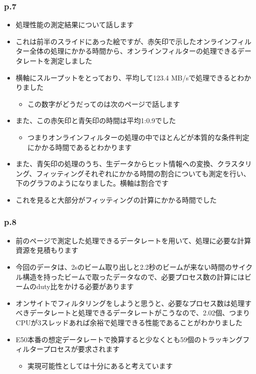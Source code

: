 \documentclass[12pt,a4paper,upLaTeX]{jsarticle}
\begin{document}
\subsubsection*{p.7}
\begin{itemize}
\item 処理性能の測定結果について話します
\item これは前半のスライドにあった絵ですが、赤矢印で示したオンラインフィルター全体の処理にかかる時間から、オンラインフィルターの処理できるデータレートを測定しました
\item 横軸にスループットをとっており、平均して123.4 MB/sで処理できるとわかりました
\begin{itemize}
\item この数字がどうだってのは次のページで話します
\end{itemize}
\item また、この赤矢印と青矢印の時間は平均1:0.9でした
\begin{itemize}
\item つまりオンラインフィルターの処理の中でほとんどが本質的な条件判定にかかる時間であるとわかります
\end{itemize}
\item また、青矢印の処理のうち、生データからヒット情報への変換、クラスタリング、フィッティングそれぞれにかかる時間の割合についても測定を行い、下のグラフのようになりました。横軸は割合です
\item これを見ると大部分がフィッティングの計算にかかる時間でした
\end{itemize}

\subsubsection*{p.8}
\begin{itemize}
\item 前のページで測定した処理できるデータレートを用いて、処理に必要な計算資源を見積もります
\item 今回のデータは、2sのビーム取り出しと2.2秒のビームが来ない時間のサイクル構造を持ったビームで取ったデータなので、必要プロセス数の計算にはビームのduty比をかける必要があります
\item オンサイトでフィルタリングをしようと思うと、必要なプロセス数は処理すべきデータレートと処理できるデータレートがこうなので、2.02個、つまりCPUが3スレッドあれば余裕で処理できる性能であることがわかりました
\item E50本番の想定データレートで換算すると少なくとも59個のトラッキングフィルタープロセスが要求されます
\begin{itemize}
\item 実現可能性としては十分にあると考えています
\end{itemize}
\end{itemize}
\end{document}
